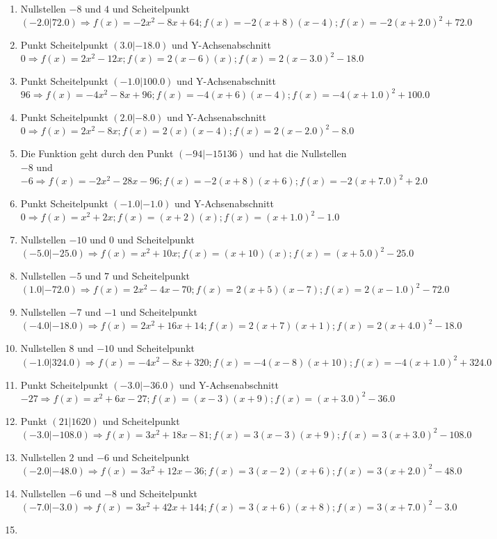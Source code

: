 \documentclass{article}%
\begin{document}
\begin{enumerate}[label=\alph*)]
\item%
 Nullstellen $-8$ und $4$ und Scheitelpunkt $(-2.0|72.0) \Rightarrow f(x)=-2x^2 - 8x + 64 ; f(x)=-2(x+8)(x-4) ; f(x)=-2(x+2.0)^2 +72.0$%
\item%
 Punkt Scheitelpunkt $(3.0|-18.0)$ und Y-Achsenabschnitt $0 \Rightarrow f(x)=2x^2 - 12x ; f(x)=2(x-6)(x) ; f(x)=2(x-3.0)^2 -18.0$%
\item%
 Punkt Scheitelpunkt $(-1.0|100.0)$ und Y-Achsenabschnitt $96 \Rightarrow f(x)=-4x^2 - 8x + 96 ; f(x)=-4(x+6)(x-4) ; f(x)=-4(x+1.0)^2 +100.0$%
\item%
 Punkt Scheitelpunkt $(2.0|-8.0)$ und Y-Achsenabschnitt $0 \Rightarrow f(x)=2x^2 - 8x ; f(x)=2(x)(x-4) ; f(x)=2(x-2.0)^2 -8.0$%
\item%
 Die Funktion geht durch den Punkt $(-94|-15136)$ und hat die Nullstellen $-8$ und $-6 \Rightarrow f(x)=-2x^2 - 28x - 96 ; f(x)=-2(x+8)(x+6) ; f(x)=-2(x+7.0)^2 +2.0$%
\item%
 Punkt Scheitelpunkt $(-1.0|-1.0)$ und Y-Achsenabschnitt $0 \Rightarrow f(x)=x^2 + 2x ; f(x)=(x+2)(x) ; f(x)=(x+1.0)^2 -1.0$%
\item%
 Nullstellen $-10$ und $0$ und Scheitelpunkt $(-5.0|-25.0) \Rightarrow f(x)=x^2 + 10x ; f(x)=(x+10)(x) ; f(x)=(x+5.0)^2 -25.0$%
\item%
 Nullstellen $-5$ und $7$ und Scheitelpunkt $(1.0|-72.0) \Rightarrow f(x)=2x^2 - 4x - 70 ; f(x)=2(x+5)(x-7) ; f(x)=2(x-1.0)^2 -72.0$%
\item%
 Nullstellen $-7$ und $-1$ und Scheitelpunkt $(-4.0|-18.0) \Rightarrow f(x)=2x^2 + 16x + 14 ; f(x)=2(x+7)(x+1) ; f(x)=2(x+4.0)^2 -18.0$%
\item%
 Nullstellen $8$ und $-10$ und Scheitelpunkt $(-1.0|324.0) \Rightarrow f(x)=-4x^2 - 8x + 320 ; f(x)=-4(x-8)(x+10) ; f(x)=-4(x+1.0)^2 +324.0$%
\item%
 Punkt Scheitelpunkt $(-3.0|-36.0)$ und Y-Achsenabschnitt $-27 \Rightarrow f(x)=x^2 + 6x - 27 ; f(x)=(x-3)(x+9) ; f(x)=(x+3.0)^2 -36.0$%
\item%
 Punkt $(21|1620)$ und Scheitelpunkt $(-3.0|-108.0) \Rightarrow f(x)=3x^2 + 18x - 81 ; f(x)=3(x-3)(x+9) ; f(x)=3(x+3.0)^2 -108.0$%
\item%
 Nullstellen $2$ und $-6$ und Scheitelpunkt $(-2.0|-48.0) \Rightarrow f(x)=3x^2 + 12x - 36 ; f(x)=3(x-2)(x+6) ; f(x)=3(x+2.0)^2 -48.0$%
\item%
 Nullstellen $-6$ und $-8$ und Scheitelpunkt $(-7.0|-3.0) \Rightarrow f(x)=3x^2 + 42x + 144 ; f(x)=3(x+6)(x+8) ; f(x)=3(x+7.0)^2 -3.0$%
\item%

\end{enumerate}
\end{document}
